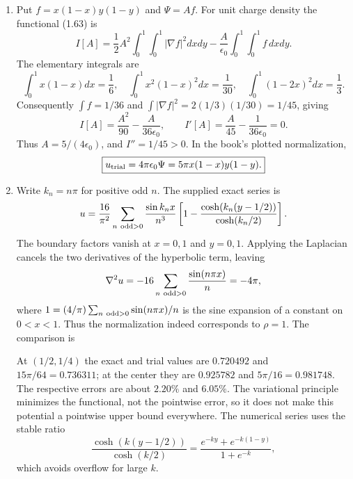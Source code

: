 \begin{enumerate}
\item[(a)] Put $f=x(1-x)y(1-y)$ and $\Psi=Af$. For unit charge density the
functional (1.63) is
\[
I[A]=\frac12 A^2\int_0^1\!\int_0^1|\nabla f|^2dxdy
-\frac{A}{\epsilon_0}\int_0^1\!\int_0^1f\,dxdy.
\]
The elementary integrals are
\[
\int_0^1x(1-x)dx=\frac16,\quad
\int_0^1x^2(1-x)^2dx=\frac1{30},\quad
\int_0^1(1-2x)^2dx=\frac13.
\]
Consequently $\int f=1/36$ and
$\int|\nabla f|^2=2(1/3)(1/30)=1/45$, giving
\[
I[A]=\frac{A^2}{90}-\frac{A}{36\epsilon_0},\qquad
I'[A]=\frac A{45}-\frac1{36\epsilon_0}=0.
\]
Thus $\boxed{A=5/(4\epsilon_0)}$, and $I''=1/45>0$.
In the book's plotted normalization,
\[\boxed{u_{\rm trial}=4\pi\epsilon_0\Psi=5\pi x(1-x)y(1-y).}\]
\item[(b)] Write $k_n=n\pi$ for positive odd $n$. The supplied exact series is
\[
u=\frac{16}{\pi^2}\sum_{n\ {\rm odd}>0}\frac{\sin k_nx}{n^3}
\left[1-\frac{\cosh(k_n(y-1/2))}{\cosh(k_n/2)}\right].
\]
The boundary factors vanish at $x=0,1$ and $y=0,1$. Applying the Laplacian
cancels the two derivatives of the hyperbolic term, leaving
\[
\nabla^2u=-16\sum_{n\ {\rm odd}>0}\frac{\sin(n\pi x)}n=-4\pi,
\]
where $1=(4/\pi)\sum_{n\ {\rm odd}>0}\sin(n\pi x)/n$ is the sine expansion
of a constant on $0<x<1$. Thus the normalization indeed corresponds to
$\rho=1$. The comparison is
\begin{center}

\end{center}
At $(1/2,1/4)$ the exact and trial values are $0.720492$ and
$15\pi/64=0.736311$; at the center they are $0.925782$ and
$5\pi/16=0.981748$. The respective errors are about $2.20\%$ and $6.05\%$.
The variational principle minimizes the functional, not the pointwise error,
so it does not make this potential a pointwise upper bound everywhere.
The numerical series uses the stable ratio
\[
\frac{\cosh(k(y-1/2))}{\cosh(k/2)}
=\frac{e^{-ky}+e^{-k(1-y)}}{1+e^{-k}},
\]
which avoids overflow for large $k$.
\end{enumerate}



